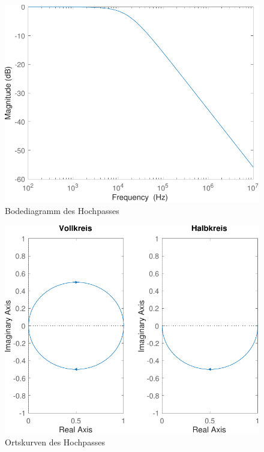 \documentclass[
    paper=a4,
    fontsize=10pt,
    DIV=13,
    oneside,
]{scrartcl}
\begin{document}
    \begin{figure}[hbt]
        \centering
        \includegraphics[width=\imagewidth]{../versuch1/bode}
        \caption{Bodediagramm des Hochpasses}
        \label{fig:bode}
    \end{figure}

    \begin{figure}
        \centering
        \includegraphics[width=\imagewidth]{../versuch1/ortskurve}
        \caption{Ortskurven des Hochpasses}
        \label{fig:ortskurve}
    \end{figure}
\end{document}

